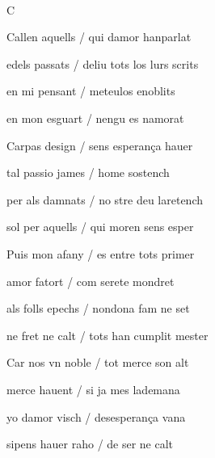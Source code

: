 \documentclass[12pt]{article}
\renewcommand{\espaiAbansEtiquetaPoema}{\vspace{0ex}}
\begin{document}
\begin{estrofa}

\espaiAbansEtiquetaPoema

\\

\begin{rubrica}

C

\end{rubrica}

\end{estrofa}


\begin{estrofa}

 Callen aquells / qui damor hanparlat

 edels passats / deliu tots los lurs scrits

 en mi pensant / meteulos enoblits

 en mon esguart / nengu es namorat

 Carpas design / sens esperan\c{c}a hauer

 tal passio james / home sostench

 per als damnats / no stre deu laretench

 sol per aquells / qui moren sens esper

\end{estrofa}



\begin{estrofa}

 Puis mon afany / es entre tots primer

 amor fatort / com serete mondret

 als folls epechs / nondona fam ne set

 ne fret ne calt / tots han cumplit mester

 Car nos vn noble / tot merce son alt

 merce hauent / si ja mes lademana

 yo damor visch / desesperan\c{c}a vana

 sipens hauer raho / de ser ne calt

\end{estrofa}
\end{document}
